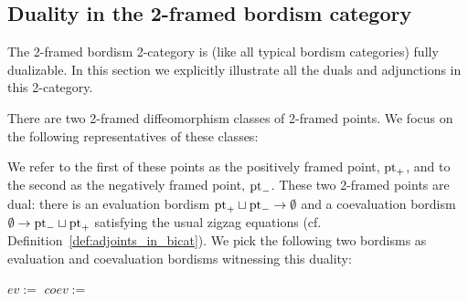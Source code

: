 \documentclass{amsart}
\begin{document}
\subsection{Duality in the 2-framed bordism category}\label{sec:framed-duality}


The 2-framed bordism 2-category is (like all typical bordism categories) fully dualizable.  In this section we explicitly illustrate all the duals and adjunctions in this 2-category.

There are two 2-framed diffeomorphism classes of 2-framed points.  We focus on the following representatives of these classes:
\begin{center}
\hspace{1.5cm}
\end{center}
We refer to the first of these points as the positively framed point, $\mathrm{pt}_+$, and to the second as the negatively framed point, $\mathrm{pt}_-$.  These two 2-framed points are dual: there is an evaluation bordism $\mathrm{pt}_+ \sqcup \mathrm{pt}_- \rightarrow \emptyset$ and a coevaluation bordism $\emptyset \rightarrow \mathrm{pt}_- \sqcup \mathrm{pt}_+$ satisfying the usual zigzag equations (cf. Definition~\ref{def:adjoints_in_bicat}).  We pick the following two bordisms as evaluation and coevaluation bordisms witnessing this duality:
\begin{center}
	$ev :=$
	\hspace{1.5cm}
	$coev :=$ 
\end{center}
\end{document}
